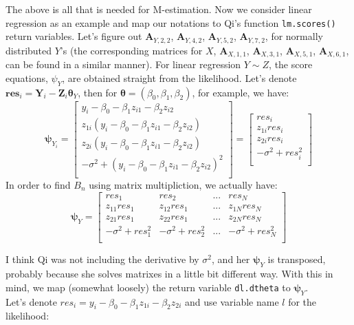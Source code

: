 \documentclass[]{article}
\begin{document}
The above is all that is needed for M-estimation. Now we consider linear regression as an example and map our notations to Qi's function \texttt{lm.scores()} return variables. Let's figure out $\pmb{A}_{Y,2,2}$, $\pmb{A}_{Y, 4,2}$, $\pmb{A}_{Y,5,2}$, $\pmb{A}_{Y, 7,2}$, for normally distributed $Y$'s (the corresponding matrices for $X$, $\pmb{A}_{X,1,1}$, $\pmb{A}_{X, 3,1}$, $\pmb{A}_{X,5,1}$, $\pmb{A}_{X, 6,1}$, can be found in a similar manner). For linear regression $Y\sim Z$, the score equations, $\psi_Y$, are obtained straight from the likelihood. Let's denote $\pmb{res}_i=\pmb{Y}_i - \pmb{Z}_i\pmb{\theta}_Y$, then for $\pmb{\theta} = (\beta_0, \beta_1, \beta_2)$, for example, we have:
\[
\pmb{\psi}_{Y_i} = 
	\begin{bmatrix}
		y_i - \beta_0 - \beta_1z_{i1} - \beta_2z_{i2}\\
		z_{1i}(y_i - \beta_0 - \beta_1z_{i1} - \beta_2z_{i2})\\
		z_{2i}(y_i - \beta_0 - \beta_1z_{i1} - \beta_2z_{i2})\\
		-\sigma^2 + (y_i - \beta_0 - \beta_1z_{i1} - \beta_2z_{i2})^2\\
 	\end{bmatrix} = 
	\begin{bmatrix}
		res_i\\
		z_{1i}res_i\\
		z_{2i}res_i\\
		-\sigma^2 + res_i^2\\
 	\end{bmatrix} 
\]
In order to find $B_n$ using matrix multipliction, we actually have:
\[
\pmb{\psi}_{Y} = 
	\begin{bmatrix}
		res_1 & res_2 & ... & res_N\\
		z_{11}res_1 & z_{12}res_1 & ... & z_{1N}res_N\\
		z_{21}res_1 & z_{22}res_1 & ... & z_{2N}res_N\\
		-\sigma^2 + res_1^2 & -\sigma^2 + res_2^2 & ... & -\sigma^2 + res_N^2\\
 	\end{bmatrix} 
\]

I think Qi was not including the derivative by $\sigma^2$, and her $\pmb{\psi}_{Y}$ is transposed, probably because she solves matrixes in a little bit different way. With this in mind, we map (somewhat loosely) the return variable \texttt{dl.dtheta} to $\pmb{\psi}_{Y}$.\\

Let's denote $res_i = y_i - \beta_0 - \beta_1z_{1i} - \beta_2z_{2i}$ and use variable name $l$ for the likelihood:  
\end{document}
